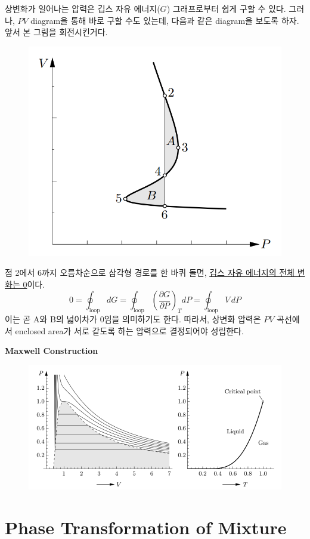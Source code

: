 \documentclass{article}
\begin{document}
\newpage

상변화가 일어나는 압력은 깁스 자유 에너지($G$) 그래프로부터 쉽게 구할 수 있다. 그러나, $PV$ diagram을 통해 바로 구할 수도 있는데, 다음과 같은 diagram을 보도록 하자. 앞서 본 그림을 회전시킨거다. 

\begin{figure}[h]
    \centering
    \includegraphics[width=0.4\linewidth]{images/fig3_9.png}
\end{figure}

\noindent
점 2에서 6까지 오름차순으로 삼각형 경로를 한 바퀴 돌면, \underline{깁스 자유 에너지의 전체 변화는 0}이다.
\begin{equation}
    0 = \oint_{\text{loop}} dG = \oint_{\text{loop}} \left( \frac{\partial G}{\partial P} \right)_T dP = \oint_{\text{loop}} V \, dP
\end{equation}
이는 곧 A와 B의 넓이차가 0임을 의미하기도 한다. 따라서, 상변화 압력은 $PV$ 곡선에서 enclosed area가 서로 같도록 하는 압력으로 결정되어야 성립한다.

\vspace{4mm}\noindent
\textbf{Maxwell Construction}

\begin{figure}[h]
    \centering
    \includegraphics[width=0.75\linewidth]{images/fig3_10.png}
\end{figure}

\newpage

\section{Phase Transformation of Mixture}
\end{document}
